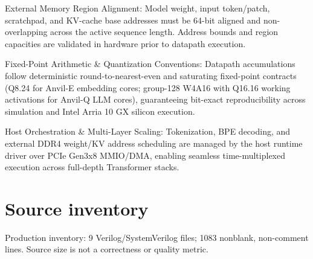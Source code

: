 \documentclass[11pt,a4paper]{article}
\begin{document}
External Memory Region Alignment: Model weight,\allowbreak{} input token/\allowbreak{}patch,\allowbreak{} scratchpad,\allowbreak{} and KV-cache base addresses must be 64-bit aligned and non-overlapping across the active sequence length. Address bounds and region capacities are validated in hardware prior to datapath execution.


Fixed-Point Arithmetic \& Quantization Conventions: Datapath accumulations follow deterministic round-to-nearest-even and saturating fixed-point contracts (\allowbreak{}Q8.24 for Anvil-E embedding cores; group-128 W4A16 with Q16.16 working activations for Anvil-Q LLM cores)\allowbreak{},\allowbreak{} guaranteeing bit-exact reproducibility across simulation and Intel Arria 10 GX silicon execution.


Host Orchestration \& Multi-Layer Scaling: Tokenization,\allowbreak{} BPE decoding,\allowbreak{} and external DDR4 weight/\allowbreak{}KV address scheduling are managed by the host runtime driver over PCIe Gen3x8 MMIO/\allowbreak{}DMA,\allowbreak{} enabling seamless time-multiplexed execution across full-depth Transformer stacks.


\appendix{}\section{Source inventory}

Production inventory: 9 Verilog/\allowbreak{}SystemVerilog files; 1083 nonblank,\allowbreak{} non-comment lines. Source size is not a correctness or quality metric.
\end{document}
